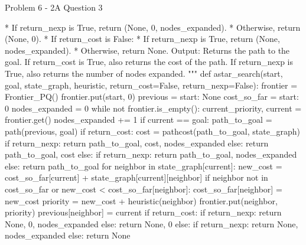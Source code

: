 \begin{problem}{Problem 6 - 2A Question 3}
\begin{highlight}[Solution]
\begin{code}[Python]
                    * If return_nexp is True, return (None, 0, nodes_expanded).
                    * Otherwise, return (None, 0).
                * If return_cost is False:
                    * If return_nexp is True, return (None, nodes_expanded).
                    * Otherwise, return None.
        Output:
            Returns the path to the goal.
            If return_cost is True, also returns the cost of the path.
            If return_nexp is True, also returns the number of nodes expanded.
    """
    def astar_search(start, goal, state_graph, heuristic, return_cost=False, return_nexp=False):
        frontier = Frontier_PQ()
        frontier.put(start, 0)
        previous = {start: None}
        cost_so_far = {start: 0}
        nodes_expanded = 0
        while not frontier.is_empty():
            current_priority, current = frontier.get()
            nodes_expanded += 1
            if current == goal:
                path_to_goal = path(previous, goal)
                if return_cost:
                    cost = pathcost(path_to_goal, state_graph)
                    if return_nexp:
                        return path_to_goal, cost, nodes_expanded
                    else:
                        return path_to_goal, cost
                else:
                    if return_nexp:
                        return path_to_goal, nodes_expanded
                    else:
                        return path_to_goal
            for neighbor in state_graph[current]:
                new_cost = cost_so_far[current] + state_graph[current][neighbor]
                if neighbor not in cost_so_far or new_cost < cost_so_far[neighbor]:
                    cost_so_far[neighbor] = new_cost
                    priority = new_cost + heuristic(neighbor)
                    frontier.put(neighbor, priority)
                    previous[neighbor] = current
        if return_cost:
            if return_nexp:
                return None, 0, nodes_expanded
            else:
                return None, 0
        else:
            if return_nexp:
                return None, nodes_expanded
            else:
                return None
    \end{code}
    \end{highlight}
\end{problem}

